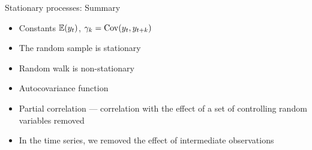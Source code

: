 	
	
		
	\begin{frame}{Stationary processes: Summary}
		
		\begin{itemize}[<+->]
			\item Constants $\mathbb{E}(y_t)$, $\gamma_k = \operatorname{Cov}(y_t, y_{t+k})$
			\item The random sample is stationary
			\item Random walk is non-stationary
			\item \alert{Autocovariance} function
			\item Partial correlation — correlation with the effect of a set of controlling random variables removed
			\item In the time series, we removed the effect of \alert{intermediate} observations
			
			
		\end{itemize}
		
	\end{frame}
	
	
